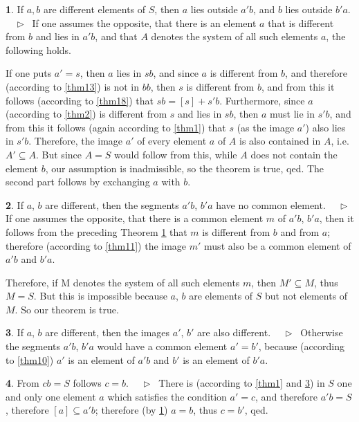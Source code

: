 \documentclass[leqno,hidelinks,10pt]{article}
\theoremstyle{definition}
\newtheorem{satz}{\protect\satzname}
\newcommand{\satzname}{}
\renewcommand{\satzname}{\hspace{-4pt}.\ Satz}%
\renewcommand{\satzname}{\hspace{-4pt}.\ Theorem}%
\newcommand\Beweis{\medskip \newline $ \phantom{'.'} \rhd \ $}%
\newcommand{\partof}{\subseteq}
\newcommand{\sref}[1]{\underline{\ref{#1}}}%
\begin{document}
\begin{paracol}{2}
\begin{rightcolumn}
\newpage

\begin{satz}\label{thm19}
If $a, b$ are different elements of $S$, then $a$ lies outside $a'b$, and $b$ lies
outside $b'a$.
\Beweis
If one assumes the opposite, that there is an element $a$ that is different from
$b$ and lies in $a'b$, and that $A$ denotes the system of all such elements $a$,
the following holds.

If one puts $a'=s$, then $a$ lies in $sb$, and since $a$ is different from $b$,
and therefore (according to \sref{thm13}) is not in $bb$, then $s$ is different
from $b$, and from this it follows (according to \sref{thm18}) that $sb = [s] + s'b$.
Furthermore, since $a$ (according to \sref{thm2}) is different from $s$ and lies
in $sb$, then $a$ must lie in $s'b$, and from this it follows (again according to
\sref{thm1}) that $s$ (as the image $a'$) also lies in $s'b$.%
Therefore, the image $a'$ of every element $a$ of $A$ is also contained in $A$,
i.e. $A' \partof A$. But since $A=S$ would follow from this, while $A$ does not
contain the element $b$, our assumption is inadmissible, so the theorem is true,
qed.
The second part follows by exchanging $a$ with $b$.%
\end{satz}

\begin{satz}\label{thm20}
If $a$, $b$ are different, then the segments $a'b$, $b'a$ have no common element.
\Beweis
If one assumes the opposite, that there is a common element $m$ of $a'b$, $b'a$,
then it follows from the preceding Theorem \sref{thm19} that $m$ is different from
$b$ and from $a$; therefore (according to \sref{thm11}) the image $m'$ must also be
a common element of $a'b$ and $b'a$.%

Therefore, if M denotes the system of all such elements $m$, then $M' \partof M$,
thus $M=S$. But this is impossible because $a$, $b$ are elements of $S$ but not
elements of $M$. So our theorem is true.%
\ \\
\end{satz}

\begin{satz}\label{thm21}
If $a$, $b$ are different, then the images $a'$, $b'$ are also different.
\Beweis
Otherwise the segments $a'b$, $b'a$ would have a common element $a'=b'$, because
(according to \sref{thm10}) $a'$ is an element of $a'b$ and $b'$ is an element
of $b'a$.%
\end{satz}

\begin{satz}\label{thm22}
From $cb=S$ follows $c = b$.
\Beweis
There is (according to \sref{thm1} and \sref{thm21}) in $S$ one and only one element
$a$ which satisfies the condition $a'=c$, and therefore $a'b = S$, therefore
$[a] \partof a'b$; therefore (by \sref{thm19}) $a=b$, thus $c=b'$, qed.%
\end{satz}


\end{rightcolumn}
\end{paracol}
\end{document}
